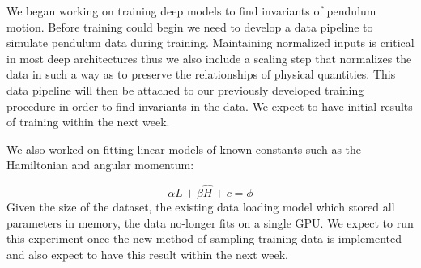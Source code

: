 \documentclass[10pt,letterpaper]{report}
\author{Brandon Houghton}
\begin{document}
We began working on training deep models to find invariants of pendulum motion. Before training could begin we need to develop a data pipeline to simulate pendulum data during training. Maintaining normalized inputs is critical in most deep architectures thus we also include a scaling step that  normalizes the data in such a way as to preserve the relationships of physical quantities. This data pipeline will then be attached to our previously developed training procedure in order to find invariants in the data. We expect to have initial results of training within the next week.

We also worked on fitting linear models of known constants such as the Hamiltonian and angular momentum: 

$$ \alpha L + \beta \hat H + c = \phi  $$
 Given the size of the dataset, the existing data loading model which stored all parameters in memory, the data no-longer fits on a single GPU. We expect to run this experiment once the new method of sampling training data is implemented and also expect to have this result within the next week.
\end{document}
